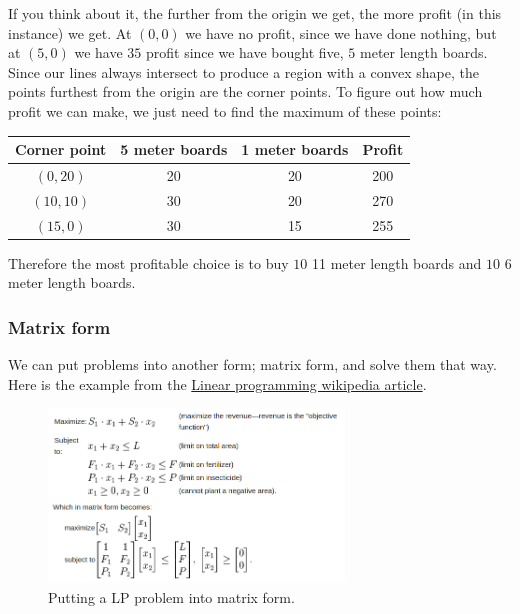 If you think about it, the further from the origin we get, the more profit (in
this instance) we get. At $(0,0)$ we have no profit, since we have done nothing,
but at $(5,0)$ we have $35$ profit since we have bought five, $5$ meter length
boards. Since our lines always intersect to produce a region with a convex
shape, the points furthest from the origin are the corner points. To figure out
how much profit we can make, we just need to find the maximum of these points:

\begin{center}
  \begin{tabular}{c | c | c | c}
    \textbf{Corner point} & \textbf{5 meter boards} & \textbf{1 meter boards}
      & \textbf{Profit}\\  \hline
    $(0,20)$  & 20 & 20 & 200\\ \hline
    $(10,10)$ & 30 & 20 & 270\\ \hline
    $(15,0)$  & 30 & 15 & 255\\
  \end{tabular}
\end{center}

Therefore the most profitable choice is to buy $10$ 11 meter length boards and
$10$ 6 meter length boards.

\subsubsection{Matrix form}

We can put problems into another form; matrix form, and solve them that way.
Here is the example from the
\href{https://en.wikipedia.org/wiki/Linear_programming}{Linear programming
wikipedia article}.

\begin{figure}[H]
  \centering
  \includegraphics[width=0.7\textwidth]{images/matrix}
  \caption{Putting a LP problem into matrix form.}
  \label{matrixform}
\end{figure}

